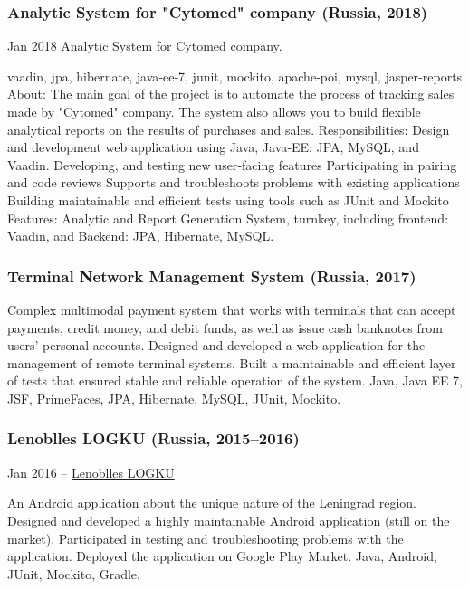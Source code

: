 \documentclass{vl}
\begin{document}
    \subsubsection*{Analytic System for "Cytomed" company (Russia, 2018)}
    Jan 2018 Analytic System for \href{https://cytomed.ru/en/}{Cytomed} company.

    vaadin, jpa, hibernate, java‐ee‐7, junit, mockito, apache‐poi, mysql, jasper‐reports
    About: The main goal of the project is to automate the process of tracking sales made by "Cytomed" company. The system
    also allows you to build flexible analytical reports on the results of purchases and sales.
    Responsibilities:
    Design and development web application using Java, Java‐EE: JPA, MySQL, and Vaadin.
    Developing, and testing new user‐facing features
    Participating in pairing and code reviews
    Supports and troubleshoots problems with existing applications
    Building maintainable and efficient tests using tools such as JUnit and Mockito
    Features:
    Analytic and Report Generation System, turnkey, including frontend: Vaadin, and Backend: JPA, Hibernate,
    MySQL.

    \subsubsection*{Terminal Network Management System (Russia, 2017)}

    Complex multimodal payment system that works with terminals that can accept payments, credit money, and debit funds,
    as well as issue cash banknotes from users' personal accounts.
    Designed and developed a web application for the management of remote terminal systems.
    Built a maintainable and efficient layer of tests that ensured stable and reliable operation of the system.
    Java, Java EE 7, JSF, PrimeFaces, JPA, Hibernate, MySQL, JUnit, Mockito.

    \subsubsection*{Lenoblles LOGKU (Russia, 2015--2016)}
    Jan 2016 – \href{https://play.google.com/store/apps/details?id=com.altinntech.oopt_lo}{Lenoblles LOGKU}

    An Android application about the unique nature of the Leningrad region.
    Designed and developed a highly maintainable Android application (still on the market).
    Participated in testing and troubleshooting problems with the application.
    Deployed the application on Google Play Market.
    Java, Android, JUnit, Mockito, Gradle.
\end{document}
